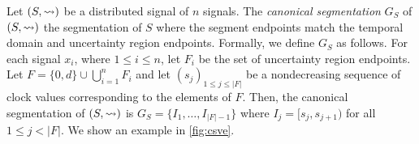 
Let $(S,{\rightsquigarrow})$ be a distributed signal of $n$ signals.
The \emph{canonical segmentation} $G_S$ of $(S,{\rightsquigarrow})$ the segmentation of $S$ where the segment endpoints match the temporal domain and uncertainty region endpoints.
Formally, we define $G_S$ as follows.
For each signal $x_i$, where $1 \leq i \leq n$, let $F_i$ be the set of uncertainty region endpoints.
Let $F = \{0, d\} \cup \bigcup_{i = 1}^{n} F_i$ and let $(s_j)_{1 \leq j \leq |F|}$ be a nondecreasing sequence of clock values corresponding to the elements of $F$.
Then, the canonical segmentation of $(S,{\rightsquigarrow})$ is $G_S = \{I_1, \ldots, I_{|F| - 1}\}$ where $I_j = [s_j, s_{j+1})$ for all $1 \leq j < |F|$.
We show an example in \cref{fig:csve}.


